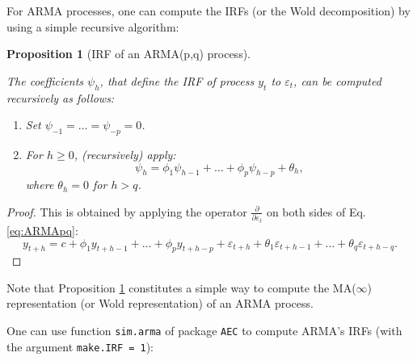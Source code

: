 \documentclass[
  12pt,
]{book}
\providecommand{\tightlist}{%
  \setlength{\itemsep}{0pt}\setlength{\parskip}{0pt}}
\newtheorem{proposition}{Proposition}[chapter]
\theoremstyle{definition}
\theoremstyle{definition}
\theoremstyle{definition}
\theoremstyle{definition}
\theoremstyle{remark}
\begin{document}
For ARMA processes, one can compute the IRFs (or the Wold decomposition) by using a simple recursive algorithm:

\begin{proposition}[IRF of an ARMA(p,q) process]
\protect\hypertarget{prp:computPsi}{}\label{prp:computPsi}

The coefficients \(\psi_h\), that define the IRF of process \(y_t\) to \(\varepsilon_t\), can be computed recursively as follows:

\begin{enumerate}
\def\labelenumi{\arabic{enumi}.}
\tightlist
\item
  Set \(\psi_{-1}=\dots=\psi_{-p}=0\).
\item
  For \(h \ge 0\), (recursively) apply:
  \[
  \psi_h = \phi_1 \psi_{h-1} + \dots + \phi_p \psi_{h-p} + \theta_h,
  \]
  where \(\theta_h = 0\) for \(h>q\).
\end{enumerate}

\end{proposition}

\begin{proof}
This is obtained by applying the operator \(\frac{\partial}{\partial \varepsilon_{t}}\) on both sides of Eq. \eqref{eq:ARMApq}:
\[
y_{t+h} = c + \phi_1 y_{t+h-1} + \dots + \phi_p y_{t+h-p} + \varepsilon_{t+h} + \theta_1 \varepsilon_{t+h-1} + \dots + \theta_q \varepsilon_{t+h-q}.
\]
\end{proof}

Note that Proposition \ref{prp:computPsi} constitutes a simple way to compute the MA(\(\infty\)) representation (or Wold representation) of an ARMA process.

One can use function \texttt{sim.arma} of package \texttt{AEC} to compute ARMA's IRFs (with the argument \texttt{make.IRF\ =\ 1}):
\end{document}
